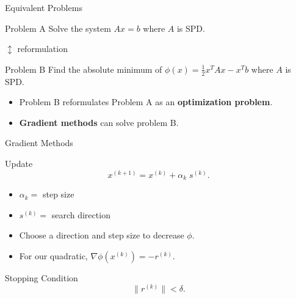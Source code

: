 \documentclass[10pt]{beamer}
\begin{document}
\begin{frame}{Equivalent Problems}
\begin{block}{Problem A}
    Solve the system $Ax=b$ where $A$ is SPD.
\end{block}
\begin{center} 
$\updownarrow$  reformulation
\end{center} \vspace{-2mm}
\begin{block}{Problem B}
    Find the absolute minimum of $\phi(x) = \frac{1}{2} x^T A x - x^T b$ where $A$ is SPD.
\end{block}
\vfill 
\begin{itemize}
    \item Problem B reformulates Problem A as an \textbf{optimization problem}.
    \item \textbf{Gradient methods} can solve problem B. 
\end{itemize}



\end{frame}


\begin{frame}{Gradient Methods}

{
}

\begin{block}{Update}
\[
    x^{(k+1)}
    =
    x^{(k)}
    +
    \alpha_k\;
    s^{(k)}.
\]
\begin{itemize}
    \item $\alpha_k=$ step size 
    \item $s^{(k)}=$ search direction
\end{itemize}
\end{block}

\begin{itemize}
    \item Choose a direction and step size to decrease $\phi$.
    \item For our quadratic, $\nabla\phi(x^{(k)})=-r^{(k)}$.
\end{itemize}

\begin{block}{Stopping Condition}
\[
    \|r^{(k)}\|<\delta.
\]
\end{block}

\end{frame}
\end{document}

